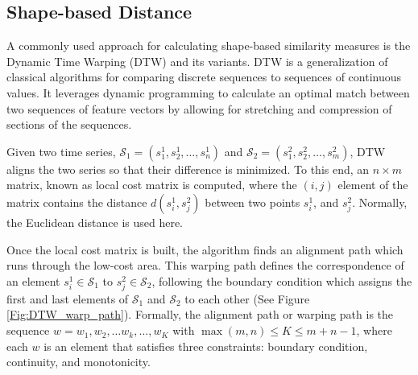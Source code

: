 \subsection{Shape-based Distance}
\label{sec:ShapeBasedDistance}

A commonly used approach for calculating shape-based similarity measures is the Dynamic Time Warping (DTW) \cite{Sakoe1978} and its variants. DTW is a generalization of classical algorithms for comparing discrete sequences to sequences of continuous values. It leverages dynamic programming to calculate an optimal match between two sequences of feature vectors by allowing for stretching and compression of sections of the sequences.  

Given two time series, $\mathcal{S}_{1} =\left(s^{1}_{1}, s^{1}_{2}, \ldots, s^{1}_{n}\right)$ and $\mathcal{S}_{2} = \left(s^{2}_{1}, s^{2}_{2}, \ldots, s^{2}_{m}\right)$, DTW aligns the two series so that their difference is minimized. To this end, an $n \times m$ matrix, known as local cost matrix is computed, where the $(i, j)$ element of the matrix contains the distance $d(s^{1}_{i}, s^{2}_{j})$ between two points $s^{1}_{i}$, and $s^{2}_{j}$. Normally, the Euclidean distance is used here.

Once the local cost matrix is built, the algorithm finds an alignment path which runs through the low-cost area. This warping path defines the correspondence of an element $s^{1}_{i} \in \mathcal{S}_{1}$ to $s^{2}_{j} \in \mathcal{S}_{2}$, following the boundary condition which assigns the first and last elements of $\mathcal{S}_{1}$ and $\mathcal{S}_{2}$ to each other (See Figure \ref{Fig:DTW_warp_path}). Formally, the alignment path or warping path is the sequence $w = w_{1} , w_{2}, \ldots w_{k}, \ldots, w_{K}$ with $\max(m, n) \leq K \leq m + n-1$, where each $w$ is an element that satisfies three constraints: boundary condition, continuity, and monotonicity. 

